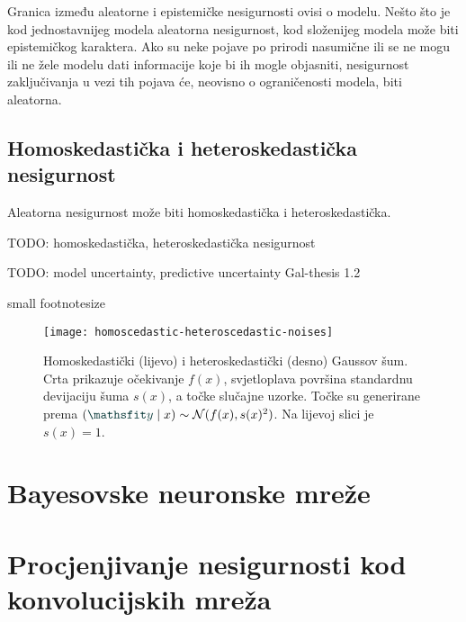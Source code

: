 \documentclass[utf8, diplomski, lmodern]{fer}
\begin{document}
Granica između aleatorne i epistemičke nesigurnosti ovisi o modelu. Nešto što je kod jednostavnijeg modela aleatorna nesigurnost, kod složenijeg modela može biti epistemičkog karaktera. Ako su neke pojave po prirodi nasumične ili se ne mogu ili ne žele modelu dati informacije koje bi ih mogle objasniti, nesigurnost zaključivanja u vezi tih pojava će, neovisno o ograničenosti modela, biti aleatorna.

\section{Homoskedastička i heteroskedastička nesigurnost}

Aleatorna nesigurnost može biti homoskedastička i heteroskedastička.

TODO: homoskedastička, heteroskedastička nesigurnost

TODO: model uncertainty, predictive uncertainty Gal-thesis 1.2

\the{}\font\newline %
\the{}\font\newline %
small {\small \the{}\font\newline} %
footnotesize {\footnotesize \the{}\font\newline} %
\the\textwidth
		
\begin{figure}
	\centering
	\texttt{[image: homoscedastic-heteroscedastic-noises]}
	\caption{Homoskedastički (lijevo) i heteroskedastički (desno) Gaussov šum.  Crta prikazuje očekivanje $f(x)$, svjetloplava površina standardnu devijaciju šuma $s(x)$, a točke slučajne uzorke. Točke su generirane prema $(\rvar y\mid x) \sim \mathcal{N}(f(x),s(x)^2)$. Na lijevoj slici je $s(x)=1$.}
	\label{fig:homoscedastic-heteroscedastic-noises}
\end{figure}
		
		

\chapter{Bayesovske neuronske mreže}



\chapter{Procjenjivanje nesigurnosti kod konvolucijskih mreža}
\end{document}
